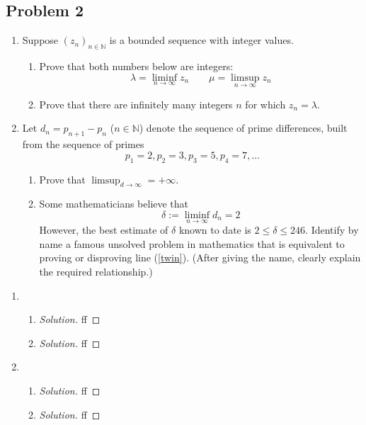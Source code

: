 \documentclass{article}
\newcommand{\N}{{\mathbb N}}
\begin{document}
\subsection*{Problem 2}
{\it
\begin{enumerate}
	\item Suppose $(z_n)_{n\in\N}$ is a bounded sequence with integer values.
	\begin{enumerate}
		\item Prove that both numbers below are integers:
			\[
				\lambda = \liminf_{n\to\infty} z_n \qquad
				\mu = \limsup_{n\to\infty} z_n
			\]
		\item Prove that there are infinitely many integers
			$n$ for which $z_n = \lambda$.
	\end{enumerate}
	\item Let $d_n = p_{n+1} - p_n$ ($n \in \N$)
		denote the sequence of prime differences,
		built from the sequence of primes
		\[
			p_1 = 2, p_2 = 3, p_3 = 5, p_4 = 7, \dots
		\]
	\begin{enumerate}
		\item Prove that $\limsup_{d\to\infty} = +\infty$.
		\item Some mathematicians believe that
			\begin{equation}\label{twin}
				\delta := \liminf_{n \to\infty} d_n = 2
			\end{equation}
			However, the best estimate of $\delta$ known to date
			is $2 \leq \delta \leq 246$.
			Identify by name a famous unsolved problem in mathematics
			that is equivalent to proving or disproving line (\ref{twin}).
			(After giving the name, clearly explain the required relationship.)
	\end{enumerate}
\end{enumerate}}

\begin{enumerate}
	\item
	\begin{enumerate}
		\item \begin{proof}[Solution]\let\qed\relax
			ff
		\end{proof}
		\item \begin{proof}[Solution]\let\qed\relax
			ff
		\end{proof}
	\end{enumerate}
	\item
	\begin{enumerate}
		\item \begin{proof}[Solution]\let\qed\relax
			ff
		\end{proof}
		\item \begin{proof}[Solution]\let\qed\relax
			ff
		\end{proof}
	\end{enumerate}
\end{enumerate}
\clearpage
\end{document}
